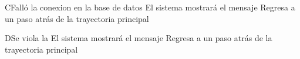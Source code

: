 \begin{UCtrayectoriaA}{C}{Falló la conexion en la base de datos}
			\UCpaso[\UCsist] El sistema mostrará el mensaje 
			\UCpaso[\UCsist] Regresa a un paso atrás de la trayectoria principal 
\end{UCtrayectoriaA}

\begin{UCtrayectoriaA}{D}{Se viola la }
			\UCpaso[\UCsist] El sistema mostrará el mensaje 
			\UCpaso[\UCsist] Regresa a un paso atrás de la trayectoria principal 
\end{UCtrayectoriaA}





